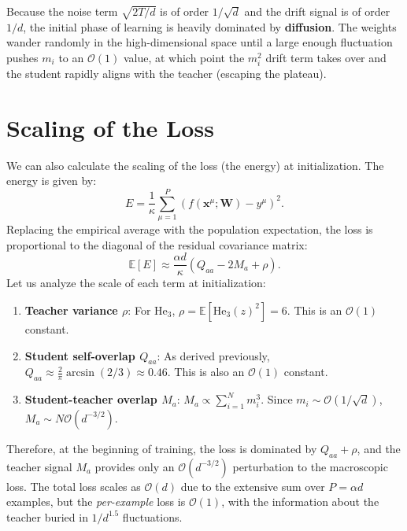 \documentclass{article}
\begin{document}
Because the noise term $\sqrt{2T/d}$ is of order $1/\sqrt{d}$ and the drift signal is of order $1/d$, the initial phase of learning is heavily dominated by \textbf{diffusion}. The weights wander randomly in the high-dimensional space until a large enough fluctuation pushes $m_i$ to an $\mathcal{O}(1)$ value, at which point the $m_i^2$ drift term takes over and the student rapidly aligns with the teacher (escaping the plateau).

\section{Scaling of the Loss}
We can also calculate the scaling of the loss (the energy) at initialization. The energy is given by:
\[
E = \frac{1}{\kappa} \sum_{\mu=1}^P \left( f(\boldsymbol{x}^\mu; \boldsymbol{W}) - y^\mu \right)^2.
\]
Replacing the empirical average with the population expectation, the loss is proportional to the diagonal of the residual covariance matrix:
\[
\mathbb{E}[E] \approx \frac{\alpha d}{\kappa} \left( Q_{aa} - 2M_a + \rho \right).
\]
Let us analyze the scale of each term at initialization:
\begin{enumerate}
    \item \textbf{Teacher variance $\rho$}: For $\text{He}_3$, $\rho = \mathbb{E}[\text{He}_3(z)^2] = 6$. This is an $\mathcal{O}(1)$ constant.
    \item \textbf{Student self-overlap $Q_{aa}$}: As derived previously, $Q_{aa} \approx \frac{2}{\pi} \arcsin(2/3) \approx 0.46$. This is also an $\mathcal{O}(1)$ constant.
    \item \textbf{Student-teacher overlap $M_a$}: $M_a \propto \sum_{i=1}^N m_i^3$. Since $m_i \sim \mathcal{O}(1/\sqrt{d})$, $M_a \sim N \mathcal{O}(d^{-3/2})$. 
\end{enumerate}
Therefore, at the beginning of training, the loss is dominated by $Q_{aa} + \rho$, and the teacher signal $M_a$ provides only an $\mathcal{O}(d^{-3/2})$ perturbation to the macroscopic loss. The total loss scales as $\mathcal{O}(d)$ due to the extensive sum over $P = \alpha d$ examples, but the \emph{per-example} loss is $\mathcal{O}(1)$, with the information about the teacher buried in $1/d^{1.5}$ fluctuations.
\end{document}
